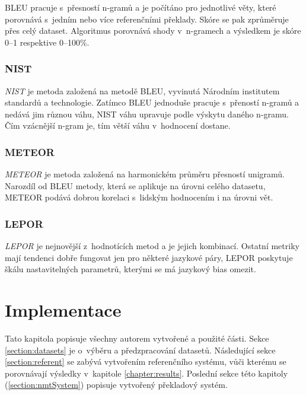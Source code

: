 BLEU pracuje s~přesností n-gramů a je počítáno pro jednotlivé věty, které porovnává s~jedním nebo více referenčními překlady. Skóre se pak zprůměruje přes celý dataset. Algoritmus porovnává shody v~n-gramech a výsledkem je skóre 0--1 respektive 0--100\%.

\subsection{NIST}
\emph{NIST} \cite{NIST} je metoda založená na metodě BLEU, vyvinutá Národním institutem standardů a technologie. Zatímco BLEU jednoduše pracuje s~přeností n-gramů a nedává jim různou váhu, NIST váhu upravuje podle výskytu daného n-gramu. Čím vzácnější n-gram je, tím větší váhu v~hodnocení dostane.


\subsection{METEOR}
\emph{METEOR} \cite{METEOR} je metoda založená na harmonickém průměru přesností unigramů. Narozdíl od BLEU metody, která se aplikuje na úrovni celého datasetu, METEOR podává dobrou korelaci s~lidským hodnocením i na úrovni vět.

\subsection{LEPOR}
\emph{LEPOR} \cite{LEPOR} je nejnovější z~hodnotících metod a je jejich kombinací. Ostatní metriky mají tendenci dobře fungovat jen pro některé jazykové páry, LEPOR poskytuje škálu nastavitelných parametrů, kterými se má jazykový bias omezit.


\chapter{Implementace} \label{chapter:implementation}
Tato kapitola popisuje všechny autorem vytvořené a použité části. Sekce \ref{section:datasets} je o~výběru a předzpracování datasetů. Následující sekce \ref{section:referent} se zabývá vytvořením referenčního systému, vůči kterému se porovnávají výsledky v~kapitole \ref{chapter:results}. Poslední sekce této kapitoly (\ref{section:nmtSystem}) popisuje vytvořený překladový systém.


